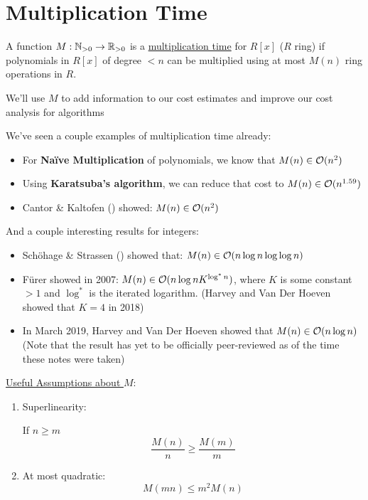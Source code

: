 \section{Multiplication Time}\label{sec:multiplication-time}
\begin{definition}{}{}
    A function $M:\operatorname{\mathbb{N}}_{> 0} \rightarrow \operatorname{\mathbb{R}}_{>0}$ is a \ul{multiplication time} for $R[x]$ ($R$ ring) if polynomials in $R[x]$ of degree $< n$ can be multiplied using at most $M(n)$ ring operations in $R$.
\end{definition}
We'll use $M$ to add information to our cost estimates and improve our cost analysis for algorithms

\begin{example}{}{}
    We've seen a couple examples of multiplication time already:
    \begin{itemize}
        \item For \textbf{Na\"{i}ve Multiplication} of polynomials, we know that $M(n) \in \operatorname{\mathcal{O}}(n^2)$
        \item Using \textbf{Karatsuba's algorithm}, we can reduce that cost to $M(n) \in \operatorname{\mathcal{O}}(n^{1.59})$
        \item Cantor \& Kaltofen () showed: $M(n) \in \operatorname{\mathcal{O}}(n^2)$
    \end{itemize}
    And a couple interesting results for integers:
    \begin{itemize}
        \item Sch\"{o}hage \& Strassen () showed that: $M(n) \in \operatorname{\mathcal{O}}(n\log n\log \log n)$
        \item F\"{u}rer showed in 2007: $M(n) \in \operatorname{\mathcal{O}}(n\log n K^{\log^* n})$, where $K$ is some constant $> 1$ and $\log^*$ is the iterated logarithm. (Harvey and Van Der Hoeven showed that $K = 4$ in 2018)
        \item In March 2019, Harvey and Van Der Hoeven \cite{harvey2019integer} showed that $M(n) \in \operatorname{\mathcal{O}}(n \log n)$ (Note that the result has yet to be officially peer-reviewed as of the time these notes were taken)
    \end{itemize}
\end{example}

\ul{Useful Assumptions about $M$}:
\begin{enumerate}
    \item Superlinearity: 
    
    If $n \geq m$ 
    \begin{equation}\label{eq:lec7-mult-time-superlinearity}
        \frac{M(n)}{n} \geq \frac{M(m)}{m}
    \end{equation}
    
    \item At most quadratic:
    \begin{equation}\label{eq:lec7-mult-time-quadratic}
        M(mn) \leq m^2M(n)
    \end{equation}
\end{enumerate}

